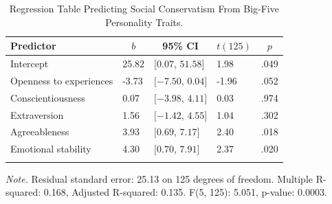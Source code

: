 \documentclass[man]{apa6}
\begin{document}
\begin{table}[tbp]
\begin{center}
\begin{threeparttable}
\caption{\label{tab:table3}Regression Table Predicting Social Conservatism From Big-Five Personality Traits.}
\begin{tabular}{lllll}
\toprule
Predictor & \multicolumn{1}{c}{$b$} & \multicolumn{1}{c}{95\% CI} & \multicolumn{1}{c}{$t(125)$} & \multicolumn{1}{c}{$p$}\\
\midrule
Intercept & 25.82 & $[0.07$, $51.58]$ & 1.98 & .049\\
Openness to experiences & -3.73 & $[-7.50$, $0.04]$ & -1.96 & .052\\
Conscientiousness & 0.07 & $[-3.98$, $4.11]$ & 0.03 & .974\\
Extraversion & 1.56 & $[-1.42$, $4.55]$ & 1.04 & .302\\
Agreeableness & 3.93 & $[0.69$, $7.17]$ & 2.40 & .018\\
Emotional stability & 4.30 & $[0.70$, $7.91]$ & 2.37 & .020\\
\bottomrule
\addlinespace
\end{tabular}
\begin{tablenotes}[para]
\normalsize{\textit{Note.} Residual standard error: 25.13 on 125 degrees of freedom.
Multiple R-squared: 0.168, Adjusted R-squared: 0.135. F(5, 125): 5.051, p-value: 0.0003.}
\end{tablenotes}
\end{threeparttable}
\end{center}
\end{table}
\end{document}
